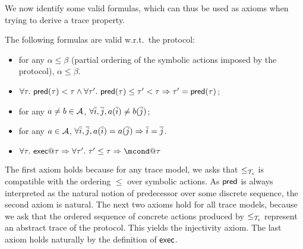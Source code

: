 We now identify some valid formulas, which can thus be used as axioms
when trying to derive a trace property. 

\begin{proposition}
  The following formulas are valid w.r.t.\ the protocol:
  \begin{itemize}
    \item for any $\alpha \leq \beta$ (partial ordering of the symbolic actions imposed by the protocol), $\alpha \leq \beta$.

    \item
      $\forall \tau.~ \textsf{pred}(\tau)<\tau \wedge
      \forall \tau'.~ \textsf{pred}(\tau)\leq\tau'<\tau \Rightarrow
      \tau'=\textsf{pred}(\tau)$; 
    \item for any $a\neq b\in\mathcal{A}$,
      $\forall \overline{i},\overline{j}, a(\overline{i})\neq b(\overline{j})$; 
    \item for any $a\in\mathcal{A}$,
      $\forall \overline{i},\overline{j}, a(\overline{i})=a(\overline{j}) \Rightarrow \overline{i}=\overline{j}$.
      \item $\forall \tau.~ \mexec@\tau \Rightarrow \forall \tau'.~\tau'\leq \tau \Rightarrow \mcond@\tau$
  \end{itemize}
\end{proposition}


The first axiom holds because for any trace model, we asks that $\leq_{\mathcal{T}_s}$ is compatible with the ordering $\leq$ over symbolic actions.
As $\textsf{pred}$ is always interpreted as the natural notion of predecessor over some discrete sequence, the second axiom is natural. The next two axioms hold for all trace models, because we ask that the ordered sequence of concrete actions produced by $\leq_{\mathcal{T}_s}$ represent an abstract trace of the protocol. This yields the injectivity axiom. The last axiom holds naturally by the definition of $\textsf{exec}$.

